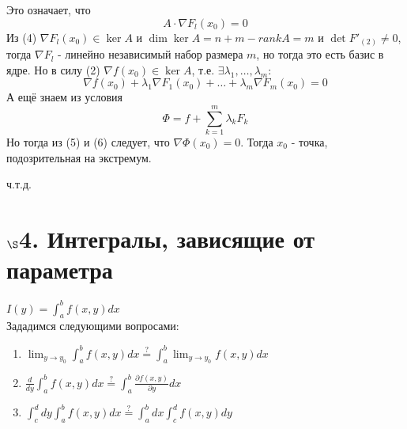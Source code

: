 \documentclass[book, 11pt]{report}
\begin{document}
{\begin{equation}
\end{equation}
Это означает, что
\begin{equation}
    A\cdot\nabla F_l(x_0)=0
\end{equation}
Из (4) $\nabla F_l(x_0)\in\ker A$ и $\dim\ker A=n+m-rank A=m$ и $\det F'_{(2)}\ne0$, тогда $\nabla F_l$ - линейно независимый набор размера $m$, но тогда это есть базис в ядре. Но в силу (2) $\nabla f(x_0)\in\ker A$, т.е. $\exists\lambda_1,\ldots,\lambda_m$:
\begin{equation}
    \nabla f(x_0)+\lambda_1\nabla F_1(x_0)+\ldots+\lambda_m\nabla F_m(x_0)=0
\end{equation}
А ещё знаем из условия
\begin{equation}
    \Phi=f+\sum_{k=1}^m\lambda_k F_k
\end{equation}
Но тогда из (5) и (6) следует, что $\nabla\Phi(x_0)=0$. Тогда $x_0$ - точка, подозрительная на экстремум.
}
\par{{\raggedleft ч.т.д.\par}}
    \vspace{0.5cm}
\section*{$\S$4. Интегралы, зависящие от параметра}
\par{$\displaystyle I(y)=\int_a^bf(x,y)dx$\\
Зададимся следующими вопросами:
\begin{enumerate}
    \item $\displaystyle\lim_{y\to y_0}\int_a^bf(x,y)dx\overset{?}{=}\int_a^b\lim_{y\to y_0} f(x,y)dx$
    \item $\displaystyle\frac{d}{dy}\int_a^bf(x,y)dx\overset{?}{=}\int_a^b\frac{\partial f(x,y)}{\partial y}dx$
    \item $\displaystyle\int_c^ddy\int_a^bf(x,y)dx\overset{?}{=}\int_a^bdx\int_c^df(x,y)dy$
\end{enumerate}
}
\vspace{0.5cm}
\setcounter{equation}{0}
\end{document}
